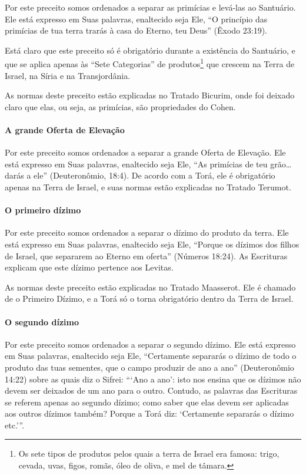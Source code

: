 Por este preceito somos ordenados a separar as primícias e levá-las ao
Santuário. Ele está expresso em Suas palavras, enaltecido seja Ele, ``O
princípio das primícias de tua terra trarás à casa do Eterno, teu
Deus'' (Êxodo 23:19).

Está claro que este preceito só é obrigatório durante a existência do
Santuário, e que se aplica apenas às ``Sete Categorias'' de
produtos\footnote{Os sete tipos de produtos pelos quais a terra de Israel era famosa:
  trigo, cevada, uvas, figos, romãs, óleo de oliva, e mel de tâmara.} que crescem na Terra de Israel, na Síria
e na Transjordânia.

As normas deste preceito estão explicadas no Tratado Bicurim, onde foi deixado claro que elas, ou seja, as primícias, são propriedades do Cohen.

\paragraph{A grande Oferta de Elevação}

Por este preceito somos ordenados a separar a grande Oferta de
Elevação. Ele está expresso em Suas palavras, enaltecido seja Ele, ``As
primícias de teu grão\ldots{} darás a ele'' (Deuteronômio, 18:4). De acordo
com a Torá, ele é obrigatório apenas na Terra de Israel, e suas normas
estão explicadas no Tratado Terumot.

\paragraph{O primeiro dízimo}

Por este preceito somos ordenados a separar o dízimo do produto da
terra. Ele está expresso em Suas palavras, enaltecido seja Ele, ``Porque
os dízimos dos filhos de Israel, que separarem ao Eterno em oferta''
(Números 18:24). As Escrituras explicam que este dízimo pertence aos
Levitas.

As normas deste preceito estão explicadas no Tratado Maasserot. Ele é
chamado de o Primeiro Dízimo, e a Torá só o torna obrigatório dentro da
Terra de Israel.

\paragraph{O segundo dízimo}

Por este preceito somos ordenados a separar o segundo dízimo. Ele está
expresso em Suas palavras, enaltecido seja Ele, ``Certamente separarás o
dízimo de todo o produto das tuas sementes, que o campo produzir de ano
a ano'' (Deuteronômio 14:22) sobre as quais diz o Sifrei: ```Ano a ano':
isto nos ensina que os dízimos não devem ser deixados de um ano para o
outro. Contudo, as palavras das Escrituras se referem apenas ao segundo
dízimo; como saber que elas devem ser aplicadas aos outros dízimos
também? Porque a Torá diz: `Certamente separarás o dízimo etc.'''.

